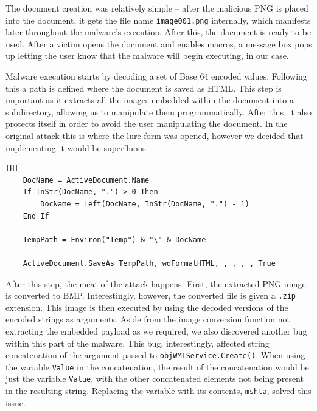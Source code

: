 The document creation was relatively simple -- after the malicious \acrshort{PNG} is placed into the document, it gets
the file name \verb+image001.png+ internally, which manifests later throughout the malware's execution. After this, the
document is ready to be used. After a victim opens the document and enables macros, a message box pops up letting the
user know that the malware will begin executing, in our case.

Malware execution starts by decoding a set of Base 64 encoded values. Following this a path is defined where the
document is saved as \acrshort{HTML}. This step is important as it extracts all the images embedded within the document
into a subdirectory, allowing us to manipulate them programmatically. After this, it also protects itself in order to
avoid the user manipulating the document. In the original attack this is where the lure form was opened, however we
decided that implementing it would be superfluous.

\begin{lstlisting}[language=VBScript, caption={The malicious document saving itself to extract embedded images.}][H]
    DocName = ActiveDocument.Name
    If InStr(DocName, ".") > 0 Then
        DocName = Left(DocName, InStr(DocName, ".") - 1)
    End If

    TempPath = Environ("Temp") & "\" & DocName

    ActiveDocument.SaveAs TempPath, wdFormatHTML, , , , , True
\end{lstlisting}

After this step, the meat of the attack happens. First, the extracted \acrshort{PNG} image is converted to
\acrshort{BMP}. Interestingly, however, the converted file is given a \verb+.zip+ extension. This image is then
executed by using the decoded versions of the encoded strings as arguments. Aside from the image conversion function not
extracting the embedded payload as we required, we also discovered another bug within this part of the malware. This
bug, interestingly, affected string concatenation of the argument passed to \verb+objWMIService.Create()+. When using
the variable \verb+Value+ in the concatenation, the result of the concatenation would be just the variable \verb+Value+,
with the other concatenated elements not being present in the resulting string. Replacing the variable with its
contents, \verb+mshta+, solved this issue.

